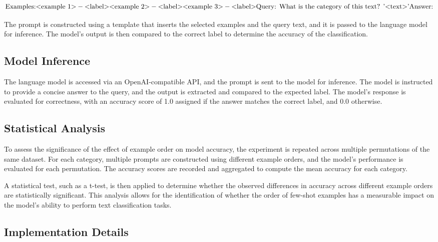 \documentclass{article}
\begin{document}
$$
\text{Examples:} \\
\text{<example 1>} - \text{<label>} \\
\text{<example 2>} - \text{<label>} \\
\text{<example 3>} - \text{<label>} \\
\text{Query: What is the category of this text? '<text>'} \\
\text{Answer:}
$$

The prompt is constructed using a template that inserts the selected examples and the query text, and it is passed to the language model for inference. The model's output is then compared to the correct label to determine the accuracy of the classification.

\subsection*{Model Inference}

The language model is accessed via an OpenAI-compatible API, and the prompt is sent to the model for inference. The model is instructed to provide a concise answer to the query, and the output is extracted and compared to the expected label. The model's response is evaluated for correctness, with an accuracy score of 1.0 assigned if the answer matches the correct label, and 0.0 otherwise.

\subsection*{Statistical Analysis}

To assess the significance of the effect of example order on model accuracy, the experiment is repeated across multiple permutations of the same dataset. For each category, multiple prompts are constructed using different example orders, and the model's performance is evaluated for each permutation. The accuracy scores are recorded and aggregated to compute the mean accuracy for each category.

A statistical test, such as a t-test, is then applied to determine whether the observed differences in accuracy across different example orders are statistically significant. This analysis allows for the identification of whether the order of few-shot examples has a measurable impact on the model's ability to perform text classification tasks.

\subsection*{Implementation Details}
\end{document}
